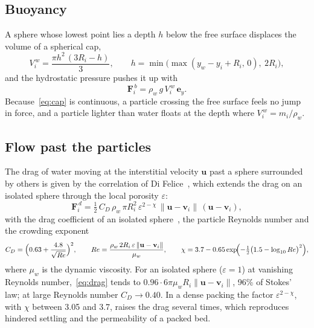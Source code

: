 \subsection{Buoyancy}

A sphere whose lowest point lies a depth $h$ below the free surface displaces
the volume of a spherical cap,
\begin{equation}
  V_{i}^{\,w} = \frac{\pi h^{2}\,(3R_{i}-h)}{3},
  \qquad h = \min\bigl(\max(y_{w}-y_{i}+R_{i},\,0),\ 2R_{i}\bigr),
  \label{eq:cap}
\end{equation}
and the hydrostatic pressure pushes it up with
\begin{equation}
  \mathbf{F}_{i}^{\,b} = \rho_{w}\,g\,V_{i}^{\,w}\,\mathbf{e}_{y}.
  \label{eq:buoyancy}
\end{equation}
Because~\eqref{eq:cap} is continuous, a particle crossing the free surface feels
no jump in force, and a particle lighter than water floats at the depth where
$V_{i}^{\,w}=m_{i}/\rho_{w}$.

\subsection{Flow past the particles}

The drag of water moving at the interstitial velocity $\mathbf{u}$ past a sphere
surrounded by others is given by the correlation of Di
Felice~\cite{difelice1994}, which extends the drag on an isolated sphere through
the local porosity $\varepsilon$:
\begin{equation}
  \mathbf{F}_{i}^{\,d} =
     \tfrac{1}{2}\,C_{D}\,\rho_{w}\,\pi R_{i}^{2}\,\varepsilon^{2-\chi}\,
     \lVert\mathbf{u}-\mathbf{v}_{i}\rVert\,(\mathbf{u}-\mathbf{v}_{i}),
  \label{eq:drag}
\end{equation}
with the drag coefficient of an isolated sphere~\cite{dallavalle1948}, the
particle Reynolds number and the crowding exponent
\begin{equation}
  C_{D} = \Bigl(0.63 + \frac{4.8}{\sqrt{Re}}\Bigr)^{2},
  \qquad
  Re = \frac{\rho_{w}\,2R_{i}\,\varepsilon\,\lVert\mathbf{u}-\mathbf{v}_{i}\rVert}{\mu_{w}},
  \qquad
  \chi = 3.7 - 0.65\exp\!\Bigl(-\tfrac{1}{2}\bigl(1.5-\log_{10}Re\bigr)^{2}\Bigr),
  \label{eq:drag-cd}
\end{equation}
where $\mu_{w}$ is the dynamic viscosity.  For an isolated sphere
($\varepsilon=1$) at vanishing Reynolds number,~\eqref{eq:drag} tends to
$0.96\cdot 6\pi\mu_{w}R_{i}\lVert\mathbf{u}-\mathbf{v}_{i}\rVert$, \num{96}\% of
Stokes' law; at large Reynolds number $C_{D}\to0.40$.  In a dense packing the
factor $\varepsilon^{2-\chi}$, with $\chi$ between \num{3.05} and \num{3.7}, raises
the drag several times, which reproduces hindered settling and the permeability
of a packed bed.

